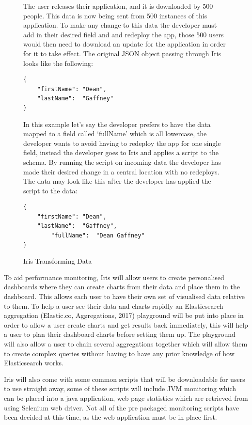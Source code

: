 \documentclass[12pt,a4paper,titlepage]{report}
\begin{document}
\begin{figure}[H]
\begin{tcolorbox}

The user releases their application, and it is downloaded by 500 people. This data is now being sent from 500 instances of this application. To make any change to this data the developer must add in their desired field and and redeploy the app, those 500 users would then need to download an update for the application in order for it to take effect. The original JSON object passing through Iris looks like the following:
\begin{verbatim}
{
	"firstName": "Dean",
	"lastName":  "Gaffney"
}
\end{verbatim}

In this example let’s say the developer prefers to have the data mapped to a field called ‘fullName’ which is all lowercase, the developer wants to avoid having to redeploy the app for one single field, instead the developer goes to Iris and applies a script to the schema. By running the script on incoming data the developer has made their desired change in a central location with no redeploys. The data may look like this after the developer has applied the script to the data:
\begin{verbatim}
{
	"firstName": "Dean",
	"lastName":  "Gaffney",
    	"fullName":  "Dean Gaffney"
}
\end{verbatim}
\end{tcolorbox}
\caption{Iris Transforming Data}
\end{figure}

To aid performance monitoring, Iris will allow users to create personalised dashboards where they can create charts from their data and place them in the dashboard. This allows each user to have their own set of visualised data relative to them. To help a user see their data and charts rapidly an Elasticsearch aggregation (Elastic.co, Aggregations, 2017) playground will be put into place in order to allow a user create charts and get results back immediately, this will help a user to plan their dashboard charts before setting them up. The playground will also allow a user to chain several aggregations together which will allow them to create complex queries without having to have any prior knowledge of how Elasticsearch works.

Iris will also come with some common scripts that will be downloadable for users to use straight away, some of these scripts will include JVM monitoring which can be placed into a java application, web page statistics which are retrieved from using Selenium web driver. Not all of the pre packaged monitoring scripts have been decided at this time, as the web application must be in place first.
\end{document}

